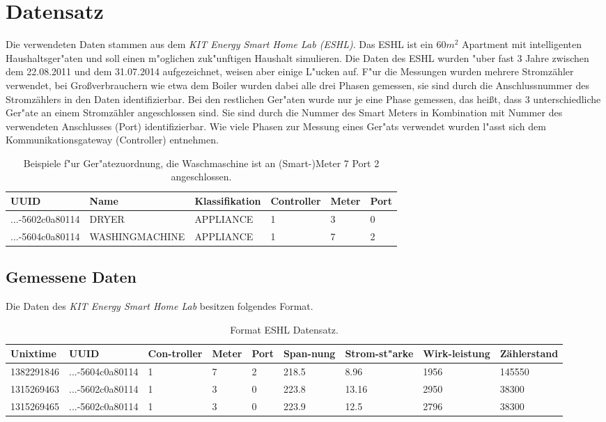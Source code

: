 \section{Datensatz}
\label{Datensatz}

Die verwendeten Daten stammen aus dem \textit{KIT Energy Smart Home Lab (ESHL)}. Das ESHL ist ein $60 m^2$ Apartment mit intelligenten Haushaltsger"aten und soll einen m"oglichen zuk"unftigen Haushalt simulieren. Die Daten des ESHL wurden "uber fast 3 Jahre zwischen dem 22.08.2011 und dem 31.07.2014 aufgezeichnet, weisen aber einige L"ucken auf. F"ur die Messungen wurden mehrere Stromzähler verwendet, bei Gro{\ss}verbrauchern wie etwa dem Boiler wurden dabei alle drei Phasen gemessen, sie sind durch die Anschlussnummer des Stromzählers in den Daten identifizierbar. Bei den restlichen Ger"aten wurde nur je eine Phase gemessen, das hei{\ss}t, dass  3 unterschiedliche Ger"ate an einem Stromzähler angeschlossen sind. Sie sind durch die Nummer des Smart Meters in Kombination mit Nummer des verwendeten Anschlusses (Port) identifizierbar. Wie viele Phasen zur Messung eines Ger"ats verwendet wurden l"asst sich dem Kommunikationsgateway (Controller) entnehmen.
\begin{table}[h]
\begin{tabular}{l|l|l|l|l|l}
UUID & Name & Klassifikation & Controller & Meter & Port \\
\hline
...-5602c0a80114 & DRYER & APPLIANCE & 1 & 3 & 0 \\
...-5604c0a80114 & WASHINGMACHINE & APPLIANCE & 1 & 7 & 2
\end{tabular}
\caption["Ubersicht Ger"atezuordnung]{Beispiele f"ur Ger"atezuordnung, die Waschmaschine ist an (Smart-)Meter 7 Port 2 angeschlossen.}
\label{profile01458}
\end{table}



\subsection{Gemessene Daten}
\label{Gemessene Daten}

Die Daten des \textit{KIT Energy Smart Home Lab} besitzen folgendes Format. \\
\begin{table}[h]
\begin{tabular}{l|l|p{1cm}|p{1cm}|p{1cm}|p{1cm}|p{1cm}|p{1.2cm}|p{2cm}}
Unixtime & UUID & Con-troller & Meter & Port & Span-nung & Strom-st"arke & Wirk-leistung & Zählerstand \\
\hline
1382291846 & ...-5604c0a80114 & 1 & 7 & 2 & 218.5 & 8.96 & 1956 & 145550  \\
1315269463 & ...-5602c0a80114 & 1 & 3 & 0 & 223.8 & 13.16 & 2950 & 38300 \\
1315269465 & ...-5602c0a80114 & 1 & 3 & 0 & 223.9 & 12.5 & 2796 & 38300
\end{tabular}
\caption[Format ESHL Daten]{Format ESHL Datensatz.}
\label{profile01458}
\end{table}

